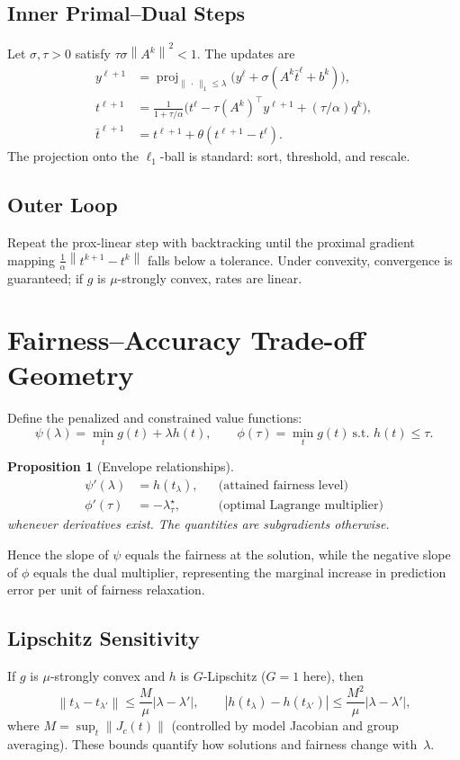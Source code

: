 \documentclass[11pt]{article}
\theoremstyle{plain}
\newtheorem{proposition}{Proposition}
\theoremstyle{definition}
\newcommand{\norm}[1]{\left\lVert #1 \right\rVert}
\newcommand{\1}{\mathbf{1}}
\begin{document}
\subsection{Inner Primal–Dual Steps}
Let $\sigma,\tau>0$ satisfy $\tau\sigma\norm{A^k}^2<1$.
The updates are
\begin{align*}
y^{\ell+1} &= \operatorname{proj}_{\|\,\cdot\,\|_1\le\lambda}
   \big(y^\ell+\sigma(A^k \bar t^\ell + b^k)\big),\\
t^{\ell+1} &= \frac{1}{1+\tau/\alpha}
   \Big(t^\ell - \tau (A^k)^\top y^{\ell+1} + (\tau/\alpha) q^k\Big),\\
\bar t^{\ell+1} &= t^{\ell+1}+\theta(t^{\ell+1}-t^\ell).
\end{align*}
The projection onto the $\ell_1$-ball is standard: sort, threshold, and rescale.

\subsection{Outer Loop}
Repeat the prox-linear step with backtracking until the proximal gradient mapping
$\frac{1}{\alpha}\norm{t^{k+1}-t^k}$ falls below a tolerance.
Under convexity, convergence is guaranteed; if $g$ is $\mu$-strongly convex, rates are linear.

\section{Fairness–Accuracy Trade-off Geometry}

Define the penalized and constrained value functions:
\[
\psi(\lambda)=\min_t g(t)+\lambda h(t),\qquad
\phi(\tau)=\min_t g(t)\ \text{s.t. } h(t)\le\tau.
\]

\begin{proposition}[Envelope relationships]
\begin{align}
\psi'(\lambda)&=h(t_\lambda), &&\text{(attained fairness level)}\\
\phi'(\tau)&=-\lambda^\star_\tau, &&\text{(optimal Lagrange multiplier)}
\end{align}
whenever derivatives exist. The quantities are subgradients otherwise.
\end{proposition}

Hence the slope of $\psi$ equals the fairness at the solution,
while the negative slope of $\phi$ equals the dual multiplier, representing
the marginal increase in prediction error per unit of fairness relaxation.

\subsection{Lipschitz Sensitivity}
If $g$ is $\mu$-strongly convex and $h$ is $G$-Lipschitz ($G=1$ here), then
\[
\norm{t_\lambda-t_{\lambda'}}\le \frac{M}{\mu}|\lambda-\lambda'|,
\qquad
|h(t_\lambda)-h(t_{\lambda'})|\le \frac{M^2}{\mu}|\lambda-\lambda'|,
\]
where $M=\sup_t\|J_c(t)\|$ (controlled by model Jacobian and group averaging).
These bounds quantify how solutions and fairness change with~$\lambda$.
\end{document}
